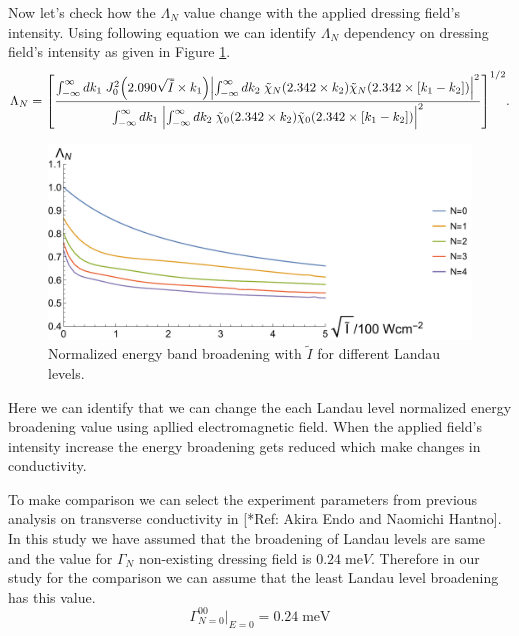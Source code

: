 \noindent
Now let's check how the $\Lambda_N$ value change with the applied dressing field's intensity. Using following equation we can identify $\Lambda_N$ dependency on dressing field's intensity as given in Figure \ref{fig:5.2}.
\begin{equation} \label{5.29}
    \Lambda_N  =
    \qty[
    \frac
    {\int_{-\infty}^{\infty} d {k}_1 \;
    J_0^2\qty(2.090\sqrt{\tilde{I}}\times{k}_1)
    \qty|
    \int_{-\infty}^{\infty} d{k}_2 \;
    \tilde{\chi}_{N}\qty(2.342 \times k_2)
    \tilde{\chi}_{N}\qty(2.342 \times \qty[{k}_1 - {k}_2])|^2}
    {\int_{-\infty}^{\infty} d {k}_1 \;
    \qty|
    \int_{-\infty}^{\infty} d{k}_2 \;
    \tilde{\chi}_{0}\qty(2.342 \times k_2)
    \tilde{\chi}_{0}\qty(2.342 \times \qty[{k}_1 - {k}_2])|^2}
    ]^{1/2}.
\end{equation}

\begin{figure}[ht!]
  \centering
  \includegraphics[scale=0.6]{figures/fig52.pdf}
  \caption{Normalized energy band broadening with $\tilde{I}$ for different Landau levels.}
  \label{fig:5.2}
\end{figure}

\noindent
Here we can identify that we can change the each Landau level normalized energy broadening value using apllied electromagnetic field. When the applied field's intensity increase the energy broadening gets reduced which make changes in conductivity.

\noindent
To make comparison we can select the experiment parameters from previous analysis on transverse conductivity in [*Ref: Akira Endo and Naomichi Hantno]. In this study we have assumed that the broadening of Landau levels are same and the value for $\Gamma_N$ non-existing dressing field is $0.24\;\text{me}V$. Therefore in our study for the comparison we can assume that the least Landau level broadening has this value.
\begin{equation} \label{5.30}
  \Gamma^{00}_{N=0}\big|_{E=0} = 0.24 \;\text{meV}
\end{equation}

